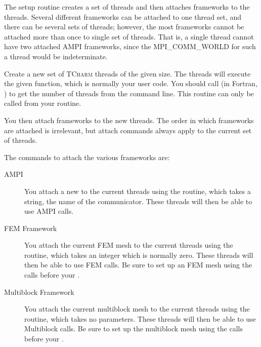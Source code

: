 \documentclass[10pt]{article}
\newcommand{\tcharm}{\textsc{TCharm}}
\begin{document}
The setup routine creates a set of threads and then attaches frameworks
to the threads.  Several different frameworks can be attached to one thread set,
and there can be several sets of threads; however, the most frameworks
cannot be attached more than once to single set of threads. That is, a single
thread cannot have two attached AMPI frameworks, since the MPI\_COMM\_WORLD 
for such a thread would be indeterminate.

\vspace{0.2in}

Create a new set of \tcharm{} threads of the given size.  The threads will
execute the given function, which is normally your user code.  
You should call  (in Fortran, 
)
to get the number of threads from the command line.  This routine can 
only be called from your  routine.

You then attach frameworks to the new threads.  The order in which
frameworks are attached is irrelevant, but attach commands always apply
to the current set of threads.
  
The commands to attach the various frameworks are:

\begin{description}
\item[AMPI] You attach a new  to the current threads
using the  routine, which takes a string, the name of the
communicator.  These threads will then be able to use AMPI calls.

\item[FEM Framework] You attach the current FEM mesh to the current threads
using the  routine, which takes an integer which is normally
zero.  These threads will then be able to use FEM calls.  Be sure to set up 
an FEM mesh using the  calls before your .

\item[Multiblock Framework] You attach the current multiblock mesh to the current threads
using the  routine, which takes no parameters.  
These threads will then be able to use Multiblock calls.  Be sure to set up 
the multiblock mesh using the  calls before your .

\end{description}
\end{document}
